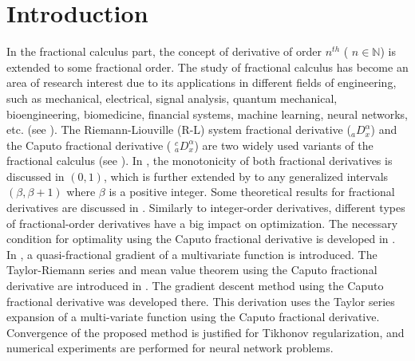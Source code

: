 \documentclass[smallextended,referee,envcountsect]{svjour3}
\begin{document}
\section{Introduction}\label{sec1}
In the fractional calculus part, the concept of derivative of order $n^{th}$ ( $n\in\mathbb{N}$) is extended to some fractional order. The study of fractional calculus has become an area of research interest due to its applications in different fields of engineering, such as mechanical, electrical, signal analysis, quantum mechanical, bioengineering, biomedicine, financial systems, machine learning, neural networks, etc. (see \cite{A1,A2,A3,A4}). The Riemann-Liouville (R-L) system fractional derivative ($_aD^{\alpha}_x$) and the Caputo fractional derivative ( $_a^cD^{\alpha}_x$) are two widely used variants of the fractional calculus (see \cite{20}). In \cite{20}, the monotonicity of both fractional derivatives is discussed in $(0,1)$, which is further extended by \cite{Barsha} to any generalized intervals $(\beta,\beta+1)$ where $\beta$ is a positive integer. Some theoretical results for fractional derivatives are discussed in \cite{23,24}. Similarly to integer-order derivatives, different types of fractional-order derivatives have a big impact on optimization. The necessary condition for optimality using the Caputo fractional derivative is developed in \cite{21}. In \cite{38}, a quasi-fractional gradient of a multivariate function is introduced. The Taylor-Riemann series and mean value theorem using the Caputo fractional derivative are introduced in \cite{72}. The gradient descent method using the Caputo fractional derivative was developed there. This derivation uses the Taylor series expansion of a multi-variate function using the Caputo fractional derivative. Convergence of the proposed method is justified for Tikhonov regularization, and numerical experiments are performed for neural network problems.
\end{document}
